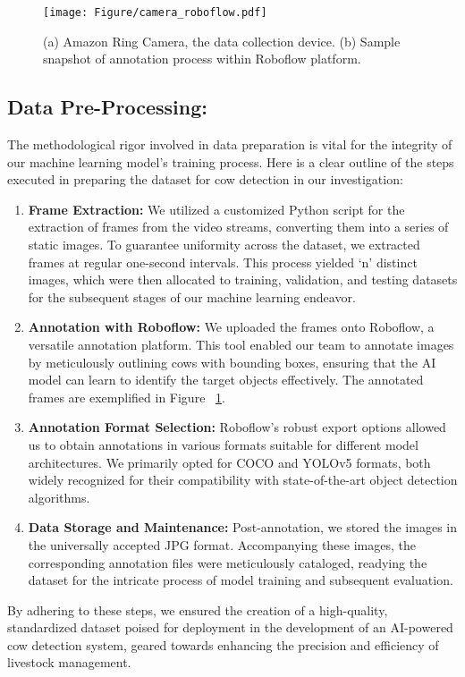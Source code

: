 \begin{figure}[h]
    \centering
    \texttt{[image: Figure/camera\_roboflow.pdf]}
    \caption{(a) Amazon Ring Camera, the data collection device. (b) Sample snapshot of annotation process within Roboflow platform.}
    \label{fig:camera-roboflow}
\end{figure}


\subsection{Data Pre-Processing:}
The methodological rigor involved in data preparation is vital for the integrity of our machine learning model's training process. Here is a clear outline of the steps executed in preparing the dataset for cow detection in our investigation:

\begin{enumerate}
    \item \textbf{Frame Extraction:} We utilized a customized Python script for the extraction of frames from the video streams, converting them into a series of static images. To guarantee uniformity across the dataset, we extracted frames at regular one-second intervals. This process yielded `n' distinct images, which were then allocated to training, validation, and testing datasets for the subsequent stages of our machine learning endeavor.


    \item \textbf{Annotation with Roboflow:} We uploaded the frames onto Roboflow, a versatile annotation platform. This tool enabled our team to annotate images by meticulously outlining cows with bounding boxes, ensuring that the AI model can learn to identify the target objects effectively. The annotated frames are exemplified in Figure ~\ref{fig:camera-roboflow}.

    \item \textbf{Annotation Format Selection:} Roboflow's robust export options allowed us to obtain annotations in various formats suitable for different model architectures. We primarily opted for COCO and YOLOv5 formats, both widely recognized for their compatibility with state-of-the-art object detection algorithms.

    \item \textbf{Data Storage and Maintenance:} Post-annotation, we stored the images in the universally accepted JPG format. Accompanying these images, the corresponding annotation files were meticulously cataloged, readying the dataset for the intricate process of model training and subsequent evaluation.
\end{enumerate}
By adhering to these steps, we ensured the creation of a high-quality, standardized dataset poised for deployment in the development of an AI-powered cow detection system, geared towards enhancing the precision and efficiency of livestock management.


